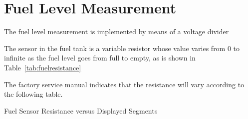 \chapter{Fuel Level Measurement}

The fuel level measurement is implemented by means of a voltage divider

The sensor in the fuel tank is a variable resistor whose value varies from 0 to infinite as the fuel level goes from full to empty, as is shown in Table~\ref{tab:fuelresistance}

The factory service manual indicates that the resistance will vary according to the following table.

\begin{table}
\caption{Fuel Sensor Resistance versus Displayed Segments}
\label{tab:fuelresistance}
\vspace{10pt}
\centering
{}
\par
\end{table}

